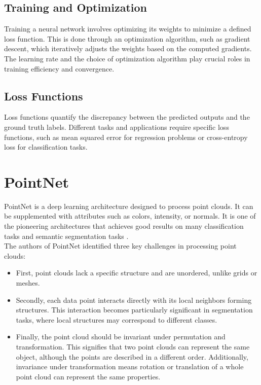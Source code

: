 \subsection{Training and Optimization}
Training a neural network involves optimizing its weights to minimize a defined loss function. This is done through an optimization algorithm, such as gradient descent, which iteratively adjusts the weights based on the computed gradients. The learning rate and the choice of optimization algorithm play crucial roles in training efficiency and convergence.


\subsection{Loss Functions}
Loss functions quantify the discrepancy between the predicted outputs and the ground truth labels. Different tasks and applications require specific loss functions, such as mean squared error for regression problems or cross-entropy loss for classification tasks.

\section{PointNet}
PointNet is a deep learning architecture designed to process point clouds. It can be supplemented with attributes such as colors, intensity, or normals. It is one of the pioneering architectures that achieves good results on many classification tasks and semantic segmentation tasks \cite{PointNet}.\\

The authors of PointNet identified three key challenges in processing point clouds:
\begin{itemize}
    \item First, point clouds lack a specific structure and are unordered, unlike grids or meshes.
    \item Secondly, each data point interacts directly with its local neighbors forming structures. This interaction becomes particularly significant in segmentation tasks, where local structures may correspond to different classes.
    \item Finally, the point cloud should be invariant under permutation and transformation. This signifies that two point clouds can represent the same object, although the points are described in a different order. Additionally, invariance under transformation means rotation or translation of a whole point cloud can represent the same properties.
\end{itemize}

